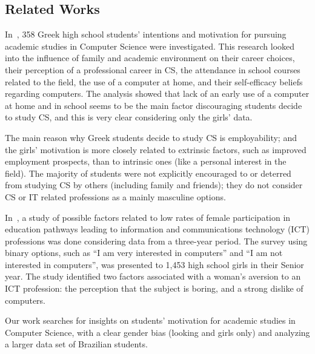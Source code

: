 
%

\subsection{Related Works}\label{sec:background:related}%

In~\cite{papastergiou_are_2008}, 358 Greek high school students' intentions and motivation for pursuing academic studies in Computer Science were investigated. This research looked into the influence of family and academic environment on their career choices, their perception of a professional career in CS, the attendance in school courses related to the field, the use of a computer at home, and their self-efficacy beliefs regarding computers. The analysis showed that lack of an early use of a computer at home and in school seems to be the main factor discouraging students decide to study CS, and this is very clear considering only the girls' data.

The main reason why Greek students decide to study CS is employability; and the girls' motivation is more closely related to extrinsic factors, such as improved employment prospects, than to intrinsic ones (like a personal interest in the field). The majority of students were not explicitly encouraged to or deterred from studying CS by others (including family and friends); they do not consider CS or IT related professions as a mainly masculine options.

In~\cite{anderson_because_2008}, a study of possible factors related to low rates of female participation in education pathways leading to information and communications technology (ICT) professions was done considering data from a three-year period. The survey using binary options, such as ``I am very interested in computers'' and ``I am not interested in computers'', was presented to 1,453 high school girls in their Senior year. The study identified two factors associated with a woman's aversion to an ICT profession: the perception that the subject is boring, and a strong dislike of computers.


Our work searches for insights on students' motivation for academic studies in Computer Science, with a clear gender bias (looking and girls only) and analyzing a larger data set of Brazilian students.
